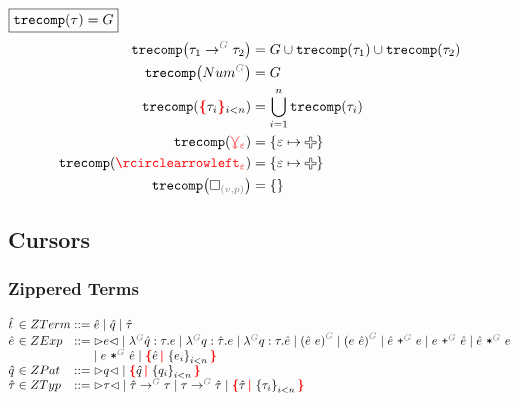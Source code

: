 \noindent $\boxed{\operatorname{\texttt{trecomp}}\mathopen{}\left(\tau\right)\mathclose{} = G}$
%
\begin{align*}
  \trecomp{\tArrow{G}{\tau_1}{\tau_2}}
    &= G \cup \trecomp{\tau_1} \cup \trecomp{\tau_2}
  \\
  \trecomp{\tNum{G}} &= G
  \\
  \trecomp{\conflictHole[i < n]{\tau_i}} &= \bigcup_{i=1}^n \trecomp{\tau_i}
  \\
  \trecomp{\multiVertex{\e}} &= \SetOf{\e \mapsto \Plus}
  \\
  \trecomp{\cycleVertex{\e}} &= \SetOf{\e \mapsto \Plus}
  \\
  \trecomp{\emptyHole{v}{p}} &= \SetOf{}
\end{align*}


\subsection{Cursors}


\subsubsection{Zippered Terms}

\[
  \arraycolsep=0pt
  \begin{array}{lcllll}
    \Z{t} & {}\in{} & ZTerm & {}::={} &
      \Z{e}
      \mid \Z{q}
      \mid \Z{\tau}
    \\
    \Z{e} & {}\in{} & ZExp & {}::={} &
      \cursor{e}
      \mid \eFun{G}{\Z{q}}{\tau}{e}
      \mid \eFun{G}{q}{\Z{\tau}}{e}
      \mid \eFun{G}{q}{\tau}{\Z{e}}
      \mid \eApp{G}{\Z{e}}{e}
      \mid \eApp{G}{e}{\Z{e}}
      \mid \ePlus{G}{\Z{e}}{e}
      \mid \ePlus{G}{e}{\Z{e}}
      \mid \eTimes{G}{\Z{e}}{e}
      \\
    &&&&
      \mid \eTimes{G}{e}{\Z{e}}
      \mid \conflictHole{\Z{e}, \SetOf{e_i}_{i < n}}
    \\
    \Z{q} & {}\in{} & ZPat & {}::={} &
      \cursor{q}
      \mid \conflictHole{\Z{q}, \SetOf{q_i}_{i < n}}
    \\
    \Z{\tau} & {}\in{} & ZTyp & {}::={} &
      \cursor{\tau}
      \mid \tArrow{G}{\Z{\tau}}{\tau}
      \mid \tArrow{G}{\tau}{\Z{\tau}}
      \mid \conflictHole{\Z{\tau}, \SetOf{\tau_i}_{i < n}}
    \\
  \end{array}
\]


